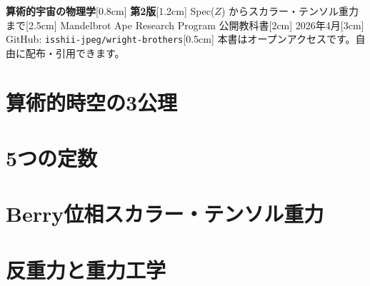 \documentclass[11pt,a4paper]{report}
\def\Z{Z}%
\def\\{}%
\theoremstyle{remark}
\newcommand{\Z}{\mathbb{Z}}
\begin{document}
\begin{titlepage}
\centering
\vspace*{2cm}
{\Huge\bfseries 算術的宇宙の物理学}\\[0.8cm]
{\Huge\bfseries 第2版}\\[1.2cm]
{\LARGE Spec($\Z$) からスカラー・テンソル重力まで}\\[2.5cm]
{\Large Mandelbrot Ape Research Program 公開教科書}\\[2cm]
{\large 2026年4月}\\[3cm]
{\normalsize GitHub: \texttt{isshii-jpeg/wright-brothers}}\\[0.5cm]
{\small 本書はオープンアクセスです。自由に配布・引用できます。}
\end{titlepage}

\tableofcontents
\newpage

\part{算術的時空の3公理}

\part{5つの定数}

\part{Berry位相スカラー・テンソル重力}

\part{反重力と重力工学}
\end{document}
